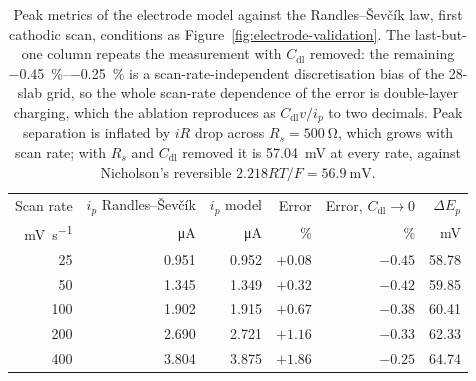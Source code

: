 \begin{table}[htbp]
  \centering
  \caption[{Peak current and peak separation of the electrode model against
  Randles--\v{S}ev\v{c}\'ik.}]{Peak metrics of the electrode model against
  the Randles--\v{S}ev\v{c}\'ik law, first cathodic scan, conditions as
  Figure~\ref{fig:electrode-validation}. The last-but-one column repeats the
  measurement with \(C_{\mathrm{dl}}\) removed: the remaining
  \SIrange{-0.45}{-0.25}{\percent} is a scan-rate-independent discretisation
  bias of the 28-slab grid, so the whole scan-rate dependence of the error is
  double-layer charging, which the ablation reproduces as
  \(C_{\mathrm{dl}}v/i_p\) to two decimals. Peak separation is inflated by
  \(iR\) drop across \(R_s = \SI{500}{\ohm}\), which grows with scan rate; with
  \(R_s\) and \(C_{\mathrm{dl}}\) removed it is \SI{57.04}{\milli\volt} at every
  rate, against Nicholson's reversible \(2.218RT/F = \SI{56.9}{\milli\volt}\).}
  \label{tab:electrode-peaks}
  \begin{tabular}{rrrrrr}
    \toprule
    Scan rate & \(i_p\) Randles--\v{S}ev\v{c}\'ik & \(i_p\) model & Error & Error, \(C_{\mathrm{dl}}\to 0\) & \(\Delta E_p\) \\
    \si{\milli\volt\per\second} & \si{\micro\ampere} & \si{\micro\ampere} & \si{\percent} & \si{\percent} & \si{\milli\volt} \\
    \midrule
     25 & 0.951 & 0.952 & $+0.08$ & $-0.45$ & 58.78 \\
     50 & 1.345 & 1.349 & $+0.32$ & $-0.42$ & 59.85 \\
    100 & 1.902 & 1.915 & $+0.67$ & $-0.38$ & 60.41 \\
    200 & 2.690 & 2.721 & $+1.16$ & $-0.33$ & 62.33 \\
    400 & 3.804 & 3.875 & $+1.86$ & $-0.25$ & 64.74 \\
    \bottomrule
  \end{tabular}
\end{table}

